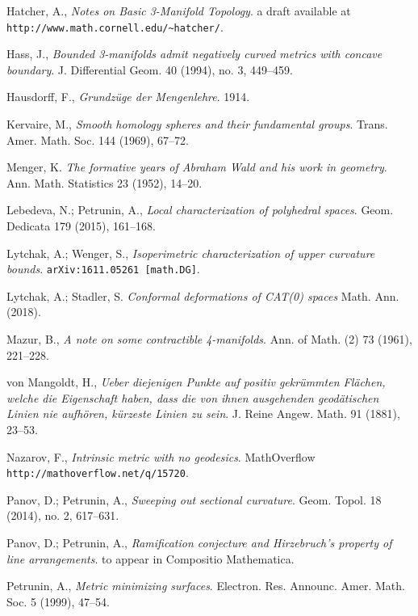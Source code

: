 \begin{thebibliography}{52}
Hatcher, A., 
\textit{Notes on Basic 3-Manifold Topology}.
a draft available at \verb+http://www.math.cornell.edu/~hatcher/+.

Hass, J.,
\textit{Bounded 3-manifolds admit negatively curved metrics with concave boundary}.
J. Differential Geom. 
40 (1994), 
no. 3, 
449--459. 

Hausdorff, F., 
\textit{Grundz\"uge der Mengenlehre}. 
1914.

Kervaire, M., 
\textit{Smooth homology spheres and their fundamental groups}.
Trans. Amer. Math. Soc. 
144 
(1969),
67--72.

Menger, K.
\textit{The formative years of Abraham Wald and his work in geometry}.
Ann. Math. Statistics 23 (1952), 14--20.

Lebedeva, N.; 
Petrunin, A., 
\textit{Local characterization of polyhedral spaces}.
Geom. Dedicata 179 (2015), 161--168.

Lytchak, A.; Wenger, S.,
\textit{Isoperimetric characterization of upper curvature bounds}.
\texttt{arXiv:1611.05261 [math.DG]}.

Lytchak, A.; Stadler, S. 
\textit{Conformal deformations of CAT(0) spaces}
Math. Ann. (2018). 

Mazur, B.,
\textit{A note on some contractible 4-manifolds}.
Ann. of Math. (2) 
73 
(1961),
221--228.

von Mangoldt, H., 
\textit{Ueber diejenigen Punkte auf positiv gekr\"ummten Fl\"achen, welche die Eigenschaft haben, dass die von ihnen ausgehenden geod\"atischen Linien nie aufh\"oren, k\"urzeste Linien zu sein}.
J. Reine Angew. Math. 91 (1881), 23--53.

Nazarov, F.,
\textit{Intrinsic metric with no geodesics}.
MathOverflow \texttt{http://mathoverflow.net/q/15720}.

Panov, D.; Petrunin, A.,
\textit{Sweeping out sectional curvature}. 
Geom. Topol. 
18 
(2014), 
no. 2, 
617--631. 

Panov, D.; Petrunin, A.,
\textit{Ramification conjecture and Hirzebruch's property of line arrangements}.
to appear in Compositio Mathematica.

Petrunin, A.,
\textit{Metric minimizing surfaces}.
Electron. Res. Announc. Amer. Math. Soc. 
5 
(1999), 
47--54.


\end{thebibliography}
